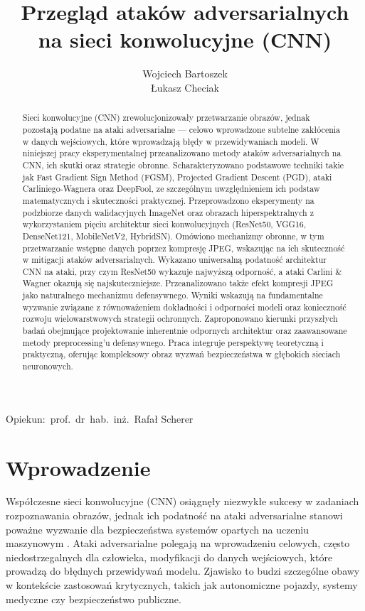 \documentclass[12pt]{article}
\title{Przegląd ataków adversarialnych na sieci konwolucyjne (CNN)}
\author{
    Wojciech Bartoszek \\
    Łukasz Checiak
}
\date{}
\begin{document}
\maketitle

\begin{center}
    Opiekun:\ prof.\ dr\ hab.\ inż.\ Rafał Scherer
\end{center}

\begin{abstract}
    Sieci konwolucyjne (CNN) zrewolucjonizowały przetwarzanie obrazów, jednak pozostają podatne na ataki adversarialne --- celowo wprowadzone subtelne zakłócenia w danych wejściowych, które wprowadzają błędy w przewidywaniach modeli. W niniejszej pracy eksperymentalnej przeanalizowano metody ataków adversarialnych na CNN, ich skutki oraz strategie obronne. Scharakteryzowano podstawowe techniki takie jak Fast Gradient Sign Method (FGSM), Projected Gradient Descent (PGD), ataki Carliniego-Wagnera oraz DeepFool, ze szczególnym uwzględnieniem ich podstaw matematycznych i skuteczności praktycznej. Przeprowadzono eksperymenty na podzbiorze danych walidacyjnych ImageNet oraz obrazach hiperspektralnych z wykorzystaniem pięciu architektur sieci konwolucyjnych (ResNet50, VGG16, DenseNet121, MobileNetV2, HybridSN). Omówiono mechanizmy obronne, w tym przetwarzanie wstępne danych poprzez kompresję JPEG, wskazując na ich skuteczność w mitigacji ataków adversarialnych. Wykazano uniwersalną podatność architektur CNN na ataki, przy czym ResNet50 wykazuje najwyższą odporność, a ataki Carlini \& Wagner okazują się najskuteczniejsze. Przeanalizowano także efekt kompresji JPEG jako naturalnego mechanizmu defensywnego. Wyniki wskazują na fundamentalne wyzwanie związane z równoważeniem dokładności i odporności modeli oraz konieczność rozwoju wielowarstwowych strategii ochronnych. Zaproponowano kierunki przyszłych badań obejmujące projektowanie inherentnie odpornych architektur oraz zaawansowane metody preprocessing'u defensywnego. Praca integruje perspektywę teoretyczną i praktyczną, oferując kompleksowy obraz wyzwań bezpieczeństwa w głębokich sieciach neuronowych.
\end{abstract}


\section{Wprowadzenie}

Współczesne sieci konwolucyjne (CNN) osiągnęły niezwykłe sukcesy w zadaniach rozpoznawania obrazów, jednak ich podatność na ataki adversarialne stanowi poważne wyzwanie dla bezpieczeństwa systemów opartych na uczeniu maszynowym \supercite{szegedy2013intriguing}. Ataki adversarialne polegają na wprowadzeniu celowych, często niedostrzegalnych dla człowieka, modyfikacji do danych wejściowych, które prowadzą do błędnych przewidywań modelu. Zjawisko to budzi szczególne obawy w kontekście zastosowań krytycznych, takich jak autonomiczne pojazdy, systemy medyczne czy bezpieczeństwo publiczne.
\end{document}
